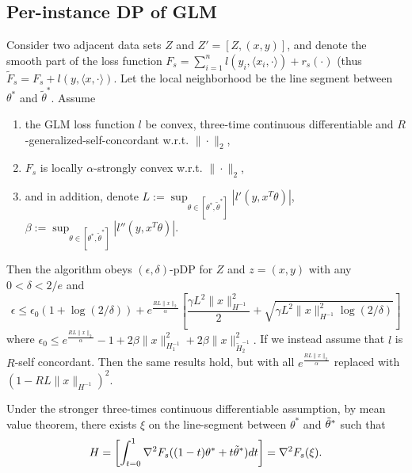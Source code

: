 \subsection{Per-instance DP of GLM}
\begin{theorem}
	Consider two adjacent data sets $Z$ and $Z' =[Z, (x,y)]$, and denote the smooth part of the loss function $F_s =   \sum_{i=1}^n l(y_i,\langle x_i, \cdot\rangle) + r_s(\cdot)$ (thus $\tilde{F}_s = F_s  +  l(y,\langle x, \cdot \rangle)$.
	Let the local neighborhood be the line segment between $\theta^*$ and $\tilde{\theta}^*$. Assume 
	\begin{enumerate}
		\item the GLM loss function $l$ be convex, three-time continuous differentiable and $R$-generalized-self-concordant w.r.t. $\|\cdot\|_2$,
		\item $F_s$ is locally $\alpha$-strongly convex w.r.t. $\|\cdot\|_2$,
		\item and in addition, denote $L := \sup_{\theta\in [\theta^*,\tilde{\theta}^*]}|l'(y,x^T\theta)|$, $\beta := \sup_{\theta\in [\theta^*,\tilde{\theta}^*]}|l''(y,x^T\theta)|$.	
	\end{enumerate}
	
	Then the algorithm obeys $(\epsilon,\delta)$-pDP for $Z$ and $z=(x,y)$ with any $0<\delta < 2/e$ and
$$
\epsilon \leq \epsilon_0(1+\log(2/\delta))  +  e^{\frac{RL\|x\|_2}{\alpha}} \left[\frac{\gamma L^2\|x\|_{H^{-1}}^2}{2} +  \sqrt{ \gamma L^2\|x\|_{H^{-1}}^2\log(2/\delta) }\right]
$$
where 
$\epsilon_0 \leq e^{\frac{RL\|x\|_2}{\alpha}} -1  + 2\beta \|x\|_{H_1^{-1}}^2 +  2\beta\|x\|_{\tilde{H}_2^{-1}}^2.$
If we instead assume that $l$ is $R$-self concordant. Then the same results hold, but with all $e^{\frac{RL\|x\|_2}{\alpha}}$ replaced with $(1-RL\|x\|_{H^{-1}})^2$.

\end{theorem}
	
	Under the stronger three-times continuous differentiable assumption, by mean value theorem, there exists $\xi$ on the line-segment between $\theta^*$ and $\tilde{\theta}^*$ such that 
	$$
	H = \left[\int_{t=0}^{1}\nabla^2 F_s((1-t)\theta^* + t\tilde{\theta}^*)  dt \right]  =  \nabla^2 F_s(\xi).
	$$
	
